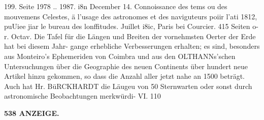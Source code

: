 \documentclass[12pt,a4paper]{article}
\begin{document}
199.     Seite  1978 ..  1987.     i8n  December  14. Connoissance  des  tems  ou  des  mouvemens  Celestes,  ä  l'usage  des  astronomes  et  des  naviguteurs  poiir l'ati  1812,  puUiee  jiar  le  bureau  des  lonffitudes.     Juillet  i8ic,     Paris  bei  Courcier.    415  Seiten  o-r.  Octav. Die  Tafel  für  die  Längen  und  Breiten  der  vornehmsten  Oerter  der  Erde  hat  bei  diesem  Jahr- gange erhebliche  Verbesserungen  erhalten;  es  sind,  besonders  aus  Monteiro's  Ephemeriden  von  Coimbra und  aus  den  OLTHANNs'schen  Untersuchungen  über  die  Geographie  des  neuen  Continents  über  hundert neue  Artikel  hinzu  gekommen,  so  dass  die  Anzahl  aller  jetzt  nahe  an  1500  beträgt.  Auch  hat  Hr. BüRCKHARDT  die  Läugeu  von  50  Sternwarten  oder  sonst  durch  astronomische  Beobachtungen  merkwürdi- VI. 110

\vspace{0.5em}


\noindent\textbf{538  ANZEIGE.}
\end{document}
